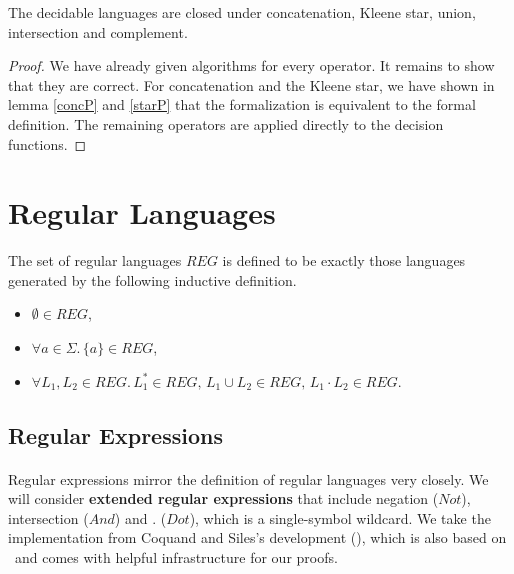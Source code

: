 
    \begin{theorem}{}
        \label{DecLangClosed}
        The decidable languages are closed under concatenation, Kleene star, union, intersection and complement. 
    \end{theorem}
    \begin{proof}
        We have already given algorithms for every operator. 
        It remains to show that they are correct.
        For concatenation and the Kleene star, we have shown in lemma \ref{concP} and \ref{starP} that the formalization is equivalent to the formal definition. The remaining operators are applied directly to the decision functions. 
    \end{proof}

    \paragraph{}


    \section{Regular Languages}


    \begin{definition}{}
        \label{REG}
        The set of regular languages $REG$ is defined to be exactly those languages generated by the following inductive definition.
        \begin{itemize}
            \item
                $\emptyset \in REG$, 
            \item
                $\forall a \in \Sigma. \, \{a\} \in REG$, 
            \item
                $\forall L_1, L_2 \in REG. \, L_1^* \in REG, \, L_1 \cup L_2 \in REG, \, L_1 \cdot L_2 \in REG$.
        \end{itemize}
    \end{definition}


    \subsection{Regular Expressions}

    \paragraph{} 
    Regular expressions mirror the definition of regular languages very closely. 
    We will consider \textbf{extended regular expressions} that include negation ($Not$), intersection ($And$) and $.$ ($Dot$), which is a single-symbol wildcard. 
    We take the implementation from Coquand and Siles's development (\cite{DBLP:conf/cpp/CoquandS11}), which is also based on \ssreflect\ and comes with helpful infrastructure for our proofs.

